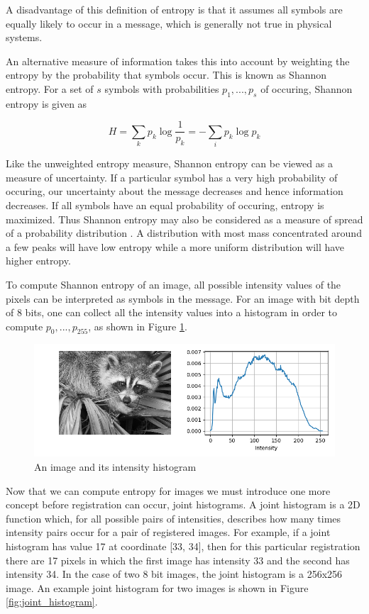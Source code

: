 \documentclass[tocnosub,noragright,centerchapter,12pt]{uiucecethesis09}
\begin{document}
A disadvantage of this definition of entropy is that it assumes all symbols are equally likely to occur in a message, which is generally not true in physical systems.

An alternative measure of information takes this into account by weighting the entropy by the probability that symbols occur.  This is known as Shannon entropy.  For a set of $s$ symbols with probabilities $p_1, ..., p_s$ of occuring, Shannon entropy is given as

$$
H = \sum_k p_k \log \frac{1}{p_k} = - \sum_i p_k \log p_k
$$

Like the unweighted entropy measure, Shannon entropy can be viewed as a measure of uncertainty.  If a particular symbol has a very high probability of occuring, our uncertainty about the message decreases and hence information decreases.  If all symbols have an equal probability of occuring, entropy is maximized.  Thus Shannon entropy may also be considered as a measure of spread of a probability distribution \cite{hartley}.  A distribution with most mass concentrated around a few peaks will have low entropy while a more uniform distribution will have higher entropy.

To compute Shannon entropy of an image, all possible intensity values of the pixels can be interpreted as symbols in the message.  For an image with bit depth of 8 bits, one can collect all the intensity values into a histogram in order to compute $p_0, ..., p_{255}$, as shown in Figure \ref{fig:histogram}.

\begin{figure}
  \centering
  \includegraphics[width=1\textwidth]{figures/histogram.png}
  \caption{
    An image and its intensity histogram
  }
  \label{fig:histogram}
\end{figure}

Now that we can compute entropy for images we must introduce one more concept before registration can occur, joint histograms.  A joint histogram is a 2D function which, for all possible pairs of intensities, describes how many times intensity pairs occur for a pair of registered images.  For example, if a joint histogram has value 17 at coordinate [33, 34], then for this particular registration there are 17 pixels in which the first image has intensity 33 and the second has intensity 34.  In the case of two 8 bit images, the joint histogram is a 256x256 image.  An example joint histogram for two images is shown in Figure \ref{fig:joint_histogram}.
\end{document}
